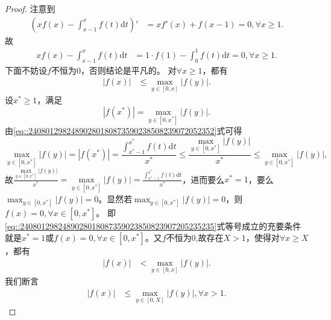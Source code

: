 \documentclass[../../main.tex]{subfiles}
\begin{document}
\begin{proof}
注意到
\begin{align*}
\left( xf\left( x \right) -\int_{x-1}^x{f\left( t \right) \mathrm{d}t} \right) ' &= xf'\left( x \right) +f\left( x-1 \right) =0,\forall x\geqslant 1. 
\end{align*}
故
\begin{align}
xf\left( x \right) -\int_{x-1}^x{f\left( t \right) \mathrm{d}t} &= 1\cdot f\left( 1 \right) -\int_0^1{f\left( t \right) \mathrm{d}t}=0,\forall x\geqslant 1. \label{eq::24080129824890280180873590238508239072052352}
\end{align}
下面不妨设$f$不恒为$0$，否则结论是平凡的。
对$\forall x\geqslant 1$，都有
\begin{align}
\left| f\left( x \right) \right| &\leqslant \max_{y\in \left[ 0,x \right]} \left| f\left( y \right) \right|. \label{eq::2408012982489028018087359023850823907205235235}
\end{align}
设$x^*\geqslant 1$，满足
\[
\left| f\left( x^* \right) \right|=\max_{y\in \left[ 0,x^* \right]} \left| f\left( y \right) \right|.
\]
由\eqref{eq::24080129824890280180873590238508239072052352}式可得
\[
\max_{y\in \left[ 0,x^* \right]} \left| f\left( y \right) \right|=\left| f\left( x^* \right) \right|=\frac{\int_{x^*-1}^{x^*}{f\left( t \right) \mathrm{d}t}}{x^*}\leqslant \frac{\max\limits_{y\in \left[ 0,x^* \right]} \left| f\left( y \right) \right|}{x^*}\leqslant \max_{y\in \left[ 0,x^* \right]} \left| f\left( y \right) \right|,
\]
故$\frac{\max\limits_{y\in \left[ 0,x^* \right]} \left| f\left( y \right) \right|}{x^*}=\max\limits_{y\in \left[ 0,x^* \right]} \left| f\left( y \right) \right|=\frac{\int_{x^*-1}^{x^*}{f\left( t \right) \mathrm{d}t}}{x^*}$，进而要么$x^*=1$，要么$\max_{y\in \left[ 0,x^* \right]} \left| f\left( y \right) \right|=0$。显然若$\max_{y\in \left[ 0,x^* \right]} \left| f\left( y \right) \right|=0$，则$f\left( x \right) =0,\forall x\in \left[ 0,x^* \right]$。
即\eqref{eq::2408012982489028018087359023850823907205235235}式等号成立的充要条件就是$x^*=1$或$f\left( x \right) =0,\forall x\in \left[ 0,x^* \right]$。又$f$不恒为0,故存在$X> 1$，使得对$\forall x\geqslant X$，都有
\begin{align}
\left| f\left( x \right) \right| &< \max_{y\in \left[ 0,x \right]} \left| f\left( y \right) \right|. \label{eq::2408012982489028018087359023850823907205235236}
\end{align}
我们断言
\begin{align}
\left| f\left( x \right) \right| &\leqslant \max_{y\in \left[ 0,X \right]} \left| f\left( y \right) \right|,\forall x>1. \label{eq::2408012982489028018087359023850823907205235237}

\end{align}
\end{proof}
\end{document}
